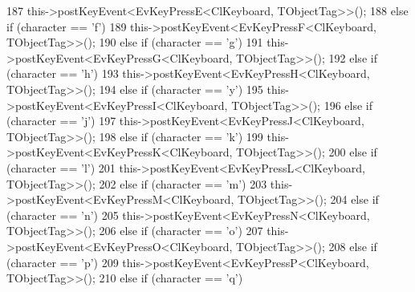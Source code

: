\begin{DoxyCode}
{187                                 this->postKeyEvent<EvKeyPressE<ClKeyboard, TObjectTag>>();
188                         \textcolor{keywordflow}{else} \textcolor{keywordflow}{if} (character == \textcolor{charliteral}{'f'})
189                                 this->postKeyEvent<EvKeyPressF<ClKeyboard, TObjectTag>>();
190                         \textcolor{keywordflow}{else} \textcolor{keywordflow}{if} (character == \textcolor{charliteral}{'g'})
191                                 this->postKeyEvent<EvKeyPressG<ClKeyboard, TObjectTag>>();
192                         \textcolor{keywordflow}{else} \textcolor{keywordflow}{if} (character == \textcolor{charliteral}{'h'})
193                                 this->postKeyEvent<EvKeyPressH<ClKeyboard, TObjectTag>>();
194                         \textcolor{keywordflow}{else} \textcolor{keywordflow}{if} (character == \textcolor{charliteral}{'y'})
195                                 this->postKeyEvent<EvKeyPressI<ClKeyboard, TObjectTag>>();
196                         \textcolor{keywordflow}{else} \textcolor{keywordflow}{if} (character == \textcolor{charliteral}{'j'})
197                                 this->postKeyEvent<EvKeyPressJ<ClKeyboard, TObjectTag>>();
198                         \textcolor{keywordflow}{else} \textcolor{keywordflow}{if} (character == \textcolor{charliteral}{'k'})
199                                 this->postKeyEvent<EvKeyPressK<ClKeyboard, TObjectTag>>();
200                         \textcolor{keywordflow}{else} \textcolor{keywordflow}{if} (character == \textcolor{charliteral}{'l'})
201                                 this->postKeyEvent<EvKeyPressL<ClKeyboard, TObjectTag>>();
202                         \textcolor{keywordflow}{else} \textcolor{keywordflow}{if} (character == \textcolor{charliteral}{'m'})
203                                 this->postKeyEvent<EvKeyPressM<ClKeyboard, TObjectTag>>();
204                         \textcolor{keywordflow}{else} \textcolor{keywordflow}{if} (character == \textcolor{charliteral}{'n'})
205                                 this->postKeyEvent<EvKeyPressN<ClKeyboard, TObjectTag>>();
206                         \textcolor{keywordflow}{else} \textcolor{keywordflow}{if} (character == \textcolor{charliteral}{'o'})
207                                 this->postKeyEvent<EvKeyPressO<ClKeyboard, TObjectTag>>();
208                         \textcolor{keywordflow}{else} \textcolor{keywordflow}{if} (character == \textcolor{charliteral}{'p'})
209                                 this->postKeyEvent<EvKeyPressP<ClKeyboard, TObjectTag>>();
210                         \textcolor{keywordflow}{else} \textcolor{keywordflow}{if} (character == \textcolor{charliteral}{'q'})
}
\end{DoxyCode}
